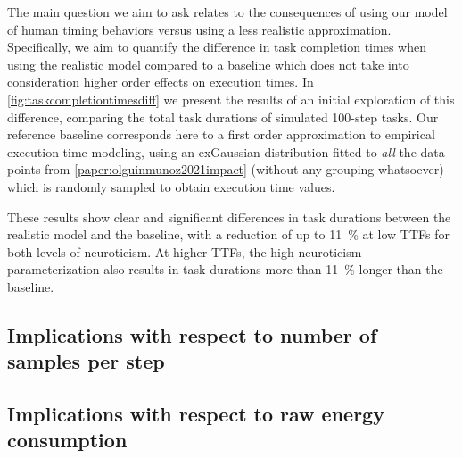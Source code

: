 The main question we aim to ask relates to the consequences of using our model of human timing behaviors versus using a less realistic approximation.
Specifically, we aim to quantify the difference in task completion times when using the realistic model compared to a baseline which does not take into consideration higher order effects on execution times.
In \cref{fig:taskcompletiontimesdiff} we present the results of an initial exploration of this difference, comparing the total task durations of simulated \num{100}-step tasks.
Our reference baseline corresponds here to a first order approximation to empirical execution time modeling, using an \gls{exGaussian} distribution fitted to \emph{all} the data points from \cref{paper:olguinmunoz2021impact} (without any grouping whatsoever) which is randomly sampled to obtain execution time values.

These results show clear and significant differences in task durations between the realistic model and the baseline, with a reduction of up to \SI{11}{\percent} at low \glspl{TTF} for both levels of neuroticism.
At higher \glspl{TTF}, the high neuroticism parameterization also results in task durations more than \SI{11}{\percent} longer than the baseline.


\subsection{Implications with respect to number of samples per step}

\subsection{Implications with respect to raw energy consumption}
